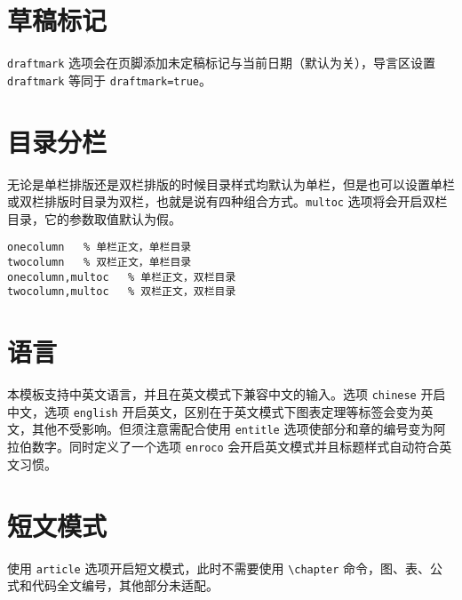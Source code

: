 \section{草稿标记}
\lstinline{draftmark} 选项会在页脚添加未定稿标记与当前日期（默认为关），导言区设置 \lstinline{draftmark} 等同于 \lstinline{draftmark=true}。

\section{目录分栏}
无论是单栏排版还是双栏排版的时候目录样式均默认为单栏，但是也可以设置单栏或双栏排版时目录为双栏，也就是说有四种组合方式。\lstinline{multoc} 选项将会开启双栏目录，它的参数取值默认为假。
\begin{lstlisting}[numbers=none]
onecolumn   % 单栏正文，单栏目录
twocolumn   % 双栏正文，单栏目录
onecolumn,multoc   % 单栏正文，双栏目录
twocolumn,multoc   % 双栏正文，双栏目录
\end{lstlisting}

\section{语言}
本模板支持中英文语言，\textsf{并且在英文模式下兼容中文的输入}。选项 \lstinline{chinese} 开启中文，选项 \lstinline{english} 开启英文，区别在于英文模式下图表定理等标签会变为英文，其他不受影响。但须注意需配合使用 \lstinline{entitle} 选项使\textsf{部分}和\textsf{章}的编号变为阿拉伯数字。同时定义了一个选项 \lstinline{enroco} 会开启英文模式并且标题样式自动符合英文习惯。

\section{短文模式}
使用 \lstinline{article} 选项开启短文模式，此时不需要使用 \lstinline{\chapter} 命令，图、表、公式和代码全文编号，其他部分未适配。

\vfill{\small\doclicenseThis}